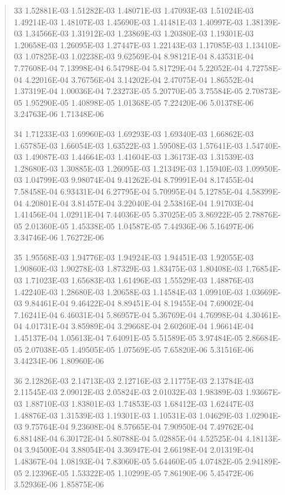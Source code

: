 \documentclass[letterpaper,10pt,english]{sphinxmanual}
\begin{document}
\begin{quote}
\begin{DUlineblock}{0em}
\item[] 33   1.52881E-03  1.51282E-03  1.48071E-03  1.47093E-03  1.51024E-03  1.49214E-03  1.48107E-03  1.45690E-03  1.41481E-03  1.40997E-03  1.38139E-03  1.34566E-03  1.31912E-03  1.23869E-03  1.20380E-03  1.19301E-03  1.20658E-03  1.26095E-03  1.27447E-03  1.22143E-03  1.17085E-03  1.13410E-03  1.07825E-03  1.02238E-03  9.62569E-04  8.98121E-04  8.43531E-04  7.77608E-04  7.13998E-04  6.54798E-04  5.81729E-04  5.22052E-04  4.72758E-04  4.22016E-04  3.76756E-04  3.14202E-04  2.47075E-04  1.86552E-04  1.37319E-04  1.00036E-04  7.23273E-05  5.20770E-05  3.75584E-05  2.70873E-05  1.95290E-05  1.40898E-05  1.01368E-05  7.22420E-06  5.01378E-06  3.24763E-06  1.71348E-06
\item[] 34   1.71233E-03  1.69960E-03  1.69293E-03  1.69340E-03  1.66862E-03  1.65785E-03  1.66054E-03  1.63522E-03  1.59508E-03  1.57641E-03  1.54740E-03  1.49087E-03  1.44664E-03  1.41604E-03  1.36173E-03  1.31539E-03  1.28680E-03  1.30885E-03  1.26095E-03  1.21349E-03  1.15940E-03  1.09950E-03  1.04799E-03  9.98074E-04  9.41262E-04  8.79991E-04  8.17455E-04  7.58458E-04  6.93431E-04  6.27795E-04  5.70995E-04  5.12785E-04  4.58399E-04  4.20801E-04  3.81457E-04  3.22040E-04  2.53816E-04  1.91703E-04  1.41456E-04  1.02911E-04  7.44036E-05  5.37025E-05  3.86922E-05  2.78876E-05  2.01360E-05  1.45338E-05  1.04587E-05  7.44936E-06  5.16497E-06  3.34746E-06  1.76272E-06
\item[] 35   1.95568E-03  1.94776E-03  1.94924E-03  1.94451E-03  1.92055E-03  1.90860E-03  1.90278E-03  1.87329E-03  1.83475E-03  1.80408E-03  1.76854E-03  1.71023E-03  1.65683E-03  1.61496E-03  1.55529E-03  1.48876E-03  1.42240E-03  1.28680E-03  1.20658E-03  1.14584E-03  1.09910E-03  1.03669E-03  9.84461E-04  9.46422E-04  8.89451E-04  8.19455E-04  7.69002E-04  7.16241E-04  6.46031E-04  5.86957E-04  5.36769E-04  4.76998E-04  4.30461E-04  4.01731E-04  3.85989E-04  3.29668E-04  2.60260E-04  1.96614E-04  1.45137E-04  1.05613E-04  7.64091E-05  5.51589E-05  3.97484E-05  2.86684E-05  2.07038E-05  1.49505E-05  1.07569E-05  7.65820E-06  5.31516E-06  3.44234E-06  1.80960E-06
\item[] 36   2.12826E-03  2.14713E-03  2.12716E-03  2.11775E-03  2.13784E-03  2.11545E-03  2.09012E-03  2.05824E-03  2.01032E-03  1.98389E-03  1.93667E-03  1.88710E-03  1.83801E-03  1.74853E-03  1.68412E-03  1.62447E-03  1.48876E-03  1.31539E-03  1.19301E-03  1.10531E-03  1.04629E-03  1.02904E-03  9.75764E-04  9.23608E-04  8.57665E-04  7.90950E-04  7.49762E-04  6.88148E-04  6.30172E-04  5.80788E-04  5.02885E-04  4.52525E-04  4.18113E-04  3.94500E-04  3.88054E-04  3.36947E-04  2.66198E-04  2.01319E-04  1.48367E-04  1.08193E-04  7.83060E-05  5.64460E-05  4.07482E-05  2.94189E-05  2.12396E-05  1.53322E-05  1.10299E-05  7.86190E-06  5.45472E-06  3.52936E-06  1.85875E-06

\end{DUlineblock}
\end{quote}
\end{document}
